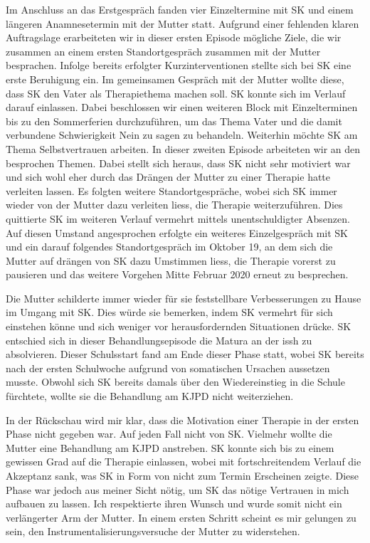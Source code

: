 Im Anschluss an das Erstgespräch fanden vier Einzeltermine mit SK und einem längeren Anamnesetermin mit der Mutter statt. Aufgrund einer fehlenden klaren Auftragslage erarbeiteten wir in dieser ersten Episode mögliche Ziele, die wir zusammen an einem ersten Standortgespräch zusammen mit der Mutter besprachen. Infolge bereits erfolgter Kurzinterventionen stellte sich bei SK eine erste Beruhigung ein. Im gemeinsamen Gespräch mit der Mutter wollte diese, dass SK den Vater als Therapiethema machen soll. SK konnte sich im Verlauf darauf einlassen. Dabei beschlossen wir einen weiteren Block mit Einzelterminen bis zu den Sommerferien durchzuführen, um das Thema Vater und die damit verbundene Schwierigkeit Nein zu sagen zu behandeln. Weiterhin möchte SK am Thema Selbstvertrauen arbeiten. In dieser zweiten Episode arbeiteten wir an den besprochen Themen. Dabei stellt sich heraus, dass SK nicht sehr motiviert war und sich wohl eher durch das Drängen der Mutter zu einer Therapie hatte verleiten lassen. Es folgten weitere Standortgespräche, wobei sich SK immer wieder von der Mutter dazu verleiten liess, die Therapie weiterzuführen. Dies quittierte SK im weiteren Verlauf vermehrt mittels unentschuldigter Absenzen. Auf diesen Umstand angesprochen erfolgte ein weiteres Einzelgespräch mit SK und ein darauf folgendes Standortgespräch im Oktober 19, an dem sich die Mutter auf drängen von SK dazu Umstimmen liess, die Therapie vorerst zu pausieren und das weitere Vorgehen Mitte Februar 2020 erneut zu besprechen.

Die Mutter schilderte immer wieder für sie feststellbare Verbesserungen zu Hause im Umgang mit SK. Dies würde sie bemerken, indem SK vermehrt für sich einstehen könne und sich weniger vor herausfordernden Situationen drücke. SK entschied sich in dieser Behandlungsepisode die Matura an der \ac{issh} zu absolvieren. Dieser Schulsstart fand am Ende dieser Phase statt, wobei SK bereits nach der ersten Schulwoche aufgrund von somatischen Ursachen aussetzen musste. Obwohl sich SK bereits damals über den Wiedereinstieg in die Schule fürchtete, wollte sie die Behandlung am KJPD nicht weiterziehen. 
 
In der Rückschau wird mir klar, dass die Motivation einer Therapie in der ersten Phase nicht gegeben war. Auf jeden Fall nicht von SK. Vielmehr wollte die Mutter eine Behandlung am KJPD anstreben. SK konnte sich bis zu einem gewissen Grad auf die Therapie einlassen, wobei mit fortschreitendem Verlauf die Akzeptanz sank, was SK in Form von nicht zum Termin Erscheinen zeigte. Diese Phase war jedoch aus meiner Sicht nötig, um SK das nötige Vertrauen in mich aufbauen zu lassen. Ich respektierte ihren Wunsch und wurde somit nicht ein verlängerter Arm der Mutter. In einem ersten Schritt scheint es mir gelungen zu sein, den Instrumentalisierungsversuche der Mutter zu widerstehen.  


